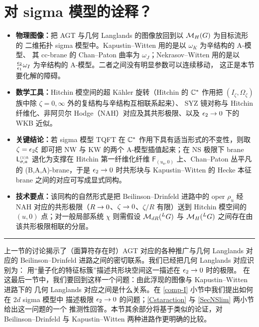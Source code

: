 \section{对 sigma 模型的诠释？}

\begin{keytakeaways}
\begin{itemize}
  \item \textbf{物理图像：}把 AGT 与几何 Langlands 的图像放回到以 $\mathcal{M}_H(G)$ 为目标流形的
        二维拓扑 sigma 模型中。Kapustin--Witten 用的是以 $\omega_K$ 为辛结构的 A-模型、
        其 cc-brane 的 Chan--Paton 曲率为 $\omega_J$；Nekrasov--Witten 用的是以
        $\frac{\epsilon_2}{\epsilon_1}\omega_I$ 为辛结构的 A-模型。二者之间没有明显参数可以连续移动，
        这正是本节要化解的障碍。
  \item \textbf{数学工具：}Hitchin 模空间的超 Kähler 旋转（Hitchin 的 $\mathbb{C}^*$ 作用把
        $(I_\zeta,\Omega_\zeta)$ 族中除 $\zeta=0,\infty$ 外的复结构与辛结构互相联系起来）、
        SYZ 镜对称与 Hitchin 纤维化、非阿贝尔 Hodge（NAH）对应及其共形极限、以及
        $\epsilon_2\to0$ 下的 WKB 近似。
  \item \textbf{关键结论：}若 sigma 模型 TQFT 在 $\mathbb{C}^*$ 作用下具有适当形式的不变性，则取
        $\zeta=\epsilon_2\xi$ 即可把 NW 与 KW 的两个 A-模型插值起来；在 NS 极限下 brane
        $\mathsf{L}_{\sigma,a}^{\scriptscriptstyle(1)\hbar}$ 退化为支撑在 Hitchin 第一纤维化纤维
        $\mathsf{F}_{(u_{\mathsf{a}},0)}$ 上、Chan--Paton 丛平凡的 (B,A,A)-brane，于是
        $\epsilon_2\to0$ 时共形块与 Kapustin--Witten 的 Hecke 本征 brane 之间的对应可写成显式同构。
  \item \textbf{技术要点：}该同构的自然形式是把 Beilinson--Drinfeld 进路中的 oper
        $\rho_u$ 经 NAH 对应的共形极限（$R\to0$、$\zeta\to0$、$\zeta/R$ 有限）送到 Hitchin
        模空间的 $(u,0)$ 点；对一般局部系统 $\chi$ 则需假设 $\mathcal{M}_{dR}({}^LG)$ 与
        $\mathcal{M}_H({}^LG)$ 之间存在由该共形极限相联的分层。
\end{itemize}
\end{keytakeaways}

\bigskip
\noindent\rule{\textwidth}{0.6pt}
\bigskip

上一节的讨论揭示了（面算符存在时）AGT 对应的各种推广与几何 Langlands 对应的
Beilinson--Drinfeld 进路之间的密切联系。我们已经把几何 Langlands 对应识别为：
用“量子化的特征标簇”描述共形块空间这一描述在 $\epsilon_2\to 0$ 时的极限。
在这最后一节中，我们要回到这样一个问题：由此浮现的图像与 Kapustin--Witten 进路下的
几何 Langlands 对应之间是什么关系。在 \ref{comp-I} 小节中我们提出如何在 $2d$ sigma 模型中
描述极限 $\epsilon_2\to 0$ 的问题；\ref{Cstaraction} 与 \ref{SecNSlim} 两小节给出这一问题的一个
推测性回答。本节其余部分将基于类似的论证，对 Beilinson--Drinfeld 与 Kapustin--Witten
两种进路作更明确的比较。


